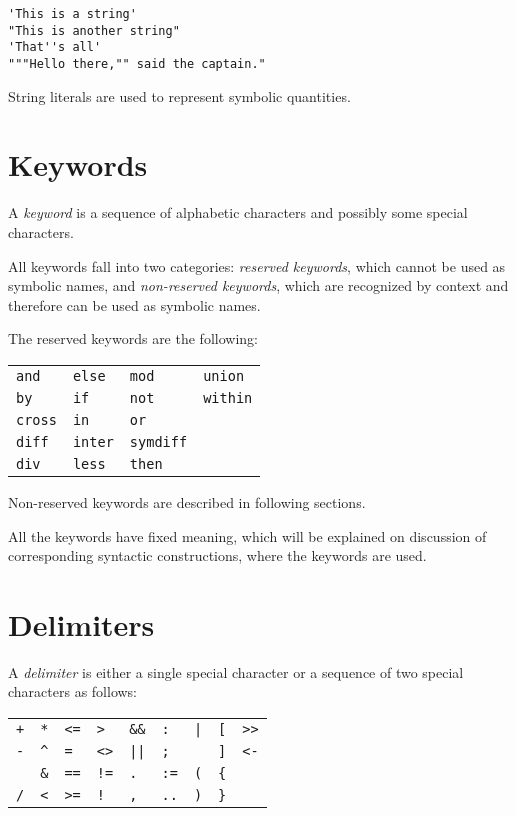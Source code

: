 \documentclass[11pt]{report}
\def\para#1{\noindent{\bf#1}}
\begin{document}
\para{Examples}

\begin{verbatim}
'This is a string'
"This is another string"
'That''s all'
"""Hello there,"" said the captain."
\end{verbatim}

String literals are used to represent symbolic quantities.

\section{Keywords}

A {\it keyword} is a sequence of alphabetic characters and possibly
some special characters.

All keywords fall into two categories: {\it reserved keywords}, which
cannot be used as symbolic names, and {\it non-reserved keywords},
which are recognized by context and therefore can be used as symbolic
names.

The reserved keywords are the following:

\noindent\hfil
\begin{tabular}{@{}p{.7in}p{.7in}p{.7in}p{.7in}@{}}
{\tt and}&{\tt else}&{\tt mod}&{\tt union}\\
{\tt by}&{\tt if}&{\tt not}&{\tt within}\\
{\tt cross}&{\tt in}&{\tt or}\\
{\tt diff}&{\tt inter}&{\tt symdiff}\\
{\tt div}&{\tt less}&{\tt then}\\
\end{tabular}

Non-reserved keywords are described in following sections.

All the keywords have fixed meaning, which will be explained on
discussion of corresponding syntactic constructions, where the keywords
are used.

\section{Delimiters}

A {\it delimiter} is either a single special character or a sequence of
two special characters as follows:

\noindent\hfil
\begin{tabular}{@{}p{.3in}p{.3in}p{.3in}p{.3in}p{.3in}p{.3in}p{.3in}
p{.3in}p{.3in}@{}}
{\tt+}&{\tt**}&{\tt<=}&{\tt>}&{\tt\&\&}&{\tt:}&{\tt|}&{\tt[}&
{\tt>>}\\
{\tt-}&{\tt\textasciicircum}&{\tt=}&{\tt<>}&{\tt||}&{\tt;}&
{\tt\char126}&{\tt]}&{\tt<-}\\
{\tt*}&{\tt\&}&{\tt==}&{\tt!=}&{\tt.}&{\tt:=}&{\tt(}&{\tt\{}\\
{\tt/}&{\tt<}&{\tt>=}&{\tt!}&{\tt,}&{\tt..}&{\tt)}&{\tt\}}\\
\end{tabular}
\end{document}

